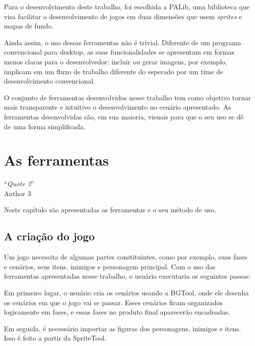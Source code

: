 \documentclass[brazil]{abnt}
\begin{document}
Para o desenvolvimento deste trabalho, foi escolhida a PALib, uma biblioteca que visa facilitar o desenvolvimento de jogos em duas dimensões que usem \textit{sprites} e mapas de fundo.

Ainda assim, o uso dessas ferramentas não é trivial. Diferente de um programa convencional para desktop, as suas funcionalidades se apresentam em formas menos claras para o desenvolvedor: incluir ou gerar imagens, por exemplo, implicam em um fluxo de trabalho diferente do esperado por um time de desenvolvimento convencional. 

O conjunto de ferramentas desenvolvidos nesse trabalho tem como objetivo tornar mais transparente e intuitivo o desenvolvimento no cenário apresentado. As ferramentas desenvolvidas são, em sua maioria, visuais para que o seu uso se dê de uma forma simplificada.

\chapter{As ferramentas\label{cap:ferramentas}}

\vfill{}
\begin{flushright}{}``\emph{Quote 3}''\\
{\small Author 3}\end{flushright}{\small \par}
\vfill{}

Neste capítulo são apresentadas as ferramentas e o seu método de uso.
\newpage

\section{A criação do jogo\label{sec:workflow}}

Um jogo necessita de algumas partes constituintes, como por exemplo, suas fases e cenários, seus itens, inimigos e personagem principal. Com o uso das ferramentas apresentadas nesse trabalho, o usuário executaria os seguintes passos:

Em primeiro lugar, o usuário cria os cenários usando a BGTool, onde ele desenha os cenários em que o jogo vai se passar. Esses cenários ficam organizados logicamente em fases, e essas fases no produto final aparecerão encadeadas.

Em seguida, é necessário importar as figuras dos personagens, inimigos e itens. Isso é feito a partir da SpriteTool. 
\end{document}
